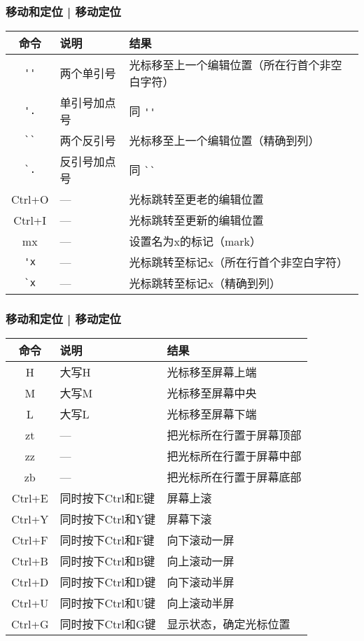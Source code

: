 \begin{frame}[fragile]
  \frametitle{移动和定位 | 移动定位}
  \begin{table}
    \centering
    \begin{tabularx}{\textwidth}{clX}
      \hline
      \rowcolor{blue!50}命令 & 说明 & 结果\\
      \hline
      \verb|''| & 两个单引号 & 光标移至上一个编辑位置\small{（所在行首个非空白字符）}\\
      \verb|'.| & 单引号加点号 & 同 \verb|''|\\
      \verb|``| & 两个反引号 & 光标移至上一个编辑位置\small{（精确到列）}\\
      \verb|`.| & 反引号加点号 & 同 \verb|``|\\
      \hline
      Ctrl+O & --- & 光标跳转至更老的编辑位置\\
      Ctrl+I & --- & 光标跳转至更新的编辑位置\\
      \hline
      mx & --- & 设置名为x的标记（mark）\\
      \verb|'x| & --- & 光标跳转至标记x\small{（所在行首个非空白字符）}\\
      \verb|`x| & --- & 光标跳转至标记x\small{（精确到列）}\\
      \hline
    \end{tabularx}
  \end{table}
\end{frame}

\begin{frame}[fragile]
  \frametitle{移动和定位 | 移动定位}
  \begin{table}
    \centering
    \begin{tabularx}{0.9\textwidth}{clX}
      \hline
      \rowcolor{blue!50}命令 & 说明 & 结果\\
      \hline
      H & 大写H & 光标移至屏幕上端\\
      M & 大写M & 光标移至屏幕中央\\
      L & 大写L & 光标移至屏幕下端\\
      \hline
      zt & --- & 把光标所在行置于屏幕顶部\\
      zz & --- & 把光标所在行置于屏幕中部\\
      zb & --- & 把光标所在行置于屏幕底部\\
      \hline
      Ctrl+E & 同时按下Ctrl和E键 & 屏幕上滚\\
      Ctrl+Y & 同时按下Ctrl和Y键 & 屏幕下滚\\
      \hline
      Ctrl+F & 同时按下Ctrl和F键 & 向下滚动一屏\\
      Ctrl+B & 同时按下Ctrl和B键 & 向上滚动一屏\\
      Ctrl+D & 同时按下Ctrl和D键 & 向下滚动半屏\\
      Ctrl+U & 同时按下Ctrl和U键 & 向上滚动半屏\\
      \hline
      Ctrl+G & 同时按下Ctrl和G键 & 显示状态，确定光标位置\\
      \hline
    \end{tabularx}
  \end{table}
\end{frame}

